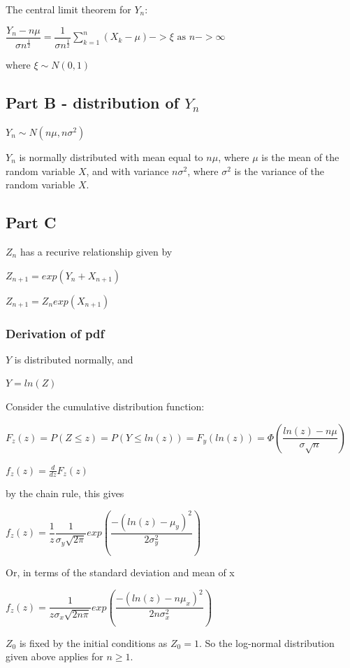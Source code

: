 \documentclass{article}
\begin{document}
\bigskip
The central limit theorem for $Y_n$:

$\dfrac{Y_n - n\mu}{\sigma n^\frac{1}{2}} = \dfrac{1}{\sigma n^\frac{1}{2}}\sum\limits_{k=1}^n (X_k - \mu) -> \xi \text{ as } n -> \infty$

where $\xi \sim N(0,1)$

\subsection{Part B - distribution of $Y_n$}

$Y_n \sim N(n\mu, n\sigma^2)$

$Y_n$ is normally distributed with mean equal to $n\mu$, where $\mu$ is the mean of the random variable $X$, and with variance $n\sigma^2$, where $\sigma^2$ is the variance of the random variable $X$. 

\subsection{Part C}

$Z_n$ has a recurive relationship given by

$Z_{n+1} = exp(Y_n + X_{n+1})$

$Z_{n+1} = Z_n exp(X_{n+1})$

\subsubsection{Derivation of pdf}

$Y$ is distributed normally, and

$Y = ln(Z)$

\bigskip

Consider the cumulative distribution function:


$F_z(z) = P(Z \leq z) = P(Y \leq ln(z)) = F_y(ln(z)) = \Phi(\dfrac{ln(z) - n\mu}{\sigma \sqrt{n}})$

$f_z(z) = \frac{d}{dz}F_z(z)$

by the chain rule, this gives

$f_z(z) = \dfrac{1}{z} \dfrac{1}{\sigma_y \sqrt{2\pi}}exp(\dfrac{-(ln(z)-\mu_y)^2}{2\sigma_y^2})$

Or, in terms of the standard deviation and mean of x

$f_z(z) = \dfrac{1}{z\sigma_x \sqrt{2n\pi}}exp(\dfrac{-(ln(z)-n\mu_x)^2}{2n\sigma_x^2})$

$Z_0$ is fixed by the initial conditions as $Z_0=1$. So the log-normal distribution given above applies for $n \geq 1$.
\end{document}
